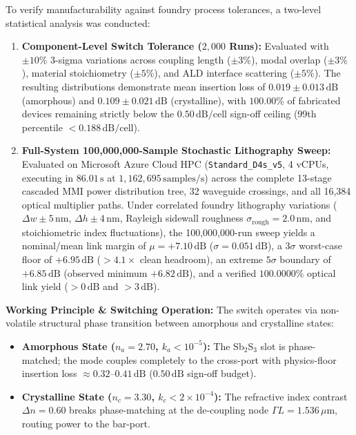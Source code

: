 \documentclass[journal]{IEEEtran}
\begin{document}
To verify manufacturability against foundry process tolerances, a two-level statistical analysis was conducted:
\begin{enumerate}
    \item \textbf{Component-Level Switch Tolerance ($2,000$ Runs):} Evaluated with $\pm 10\%$ 3-sigma variations across coupling length ($\pm 3\%$), modal overlap ($\pm 3\%$), material stoichiometry ($\pm 5\%$), and ALD interface scattering ($\pm 5\%$). The resulting distributions demonstrate mean insertion loss of $0.019 \pm 0.013\,\mathrm{dB}$ (amorphous) and $0.109 \pm 0.021\,\mathrm{dB}$ (crystalline), with $100.00\%$ of fabricated devices remaining strictly below the $0.50\,\mathrm{dB/cell}$ sign-off ceiling (99th percentile $<0.188\,\mathrm{dB/cell}$).
    \item \textbf{Full-System 100,000,000-Sample Stochastic Lithography Sweep:} Evaluated on Microsoft Azure Cloud HPC (\texttt{Standard\_D4s\_v5}, 4 vCPUs, executing in $86.01\,\mathrm{s}$ at $1,162,695\,\mathrm{samples/s}$) across the complete 13-stage cascaded MMI power distribution tree, 32 waveguide crossings, and all 16,384 optical multiplier paths. Under correlated foundry lithography variations ($\Delta w \pm 5\,\mathrm{nm}$, $\Delta h \pm 4\,\mathrm{nm}$, Rayleigh sidewall roughness $\sigma_{\mathrm{rough}} = 2.0\,\mathrm{nm}$, and stoichiometric index fluctuations), the 100,000,000-run sweep yields a nominal/mean link margin of $\mu = +7.10\,\mathrm{dB}$ ($\sigma = 0.051\,\mathrm{dB}$), a $3\sigma$ worst-case floor of $+6.95\,\mathrm{dB}$ ($>4.1\times$ clean headroom), an extreme $5\sigma$ boundary of $+6.85\,\mathrm{dB}$ (observed minimum $+6.82\,\mathrm{dB}$), and a verified $\mathbf{100.0000\%}$ optical link yield ($>0\,\mathrm{dB}$ and $>3\,\mathrm{dB}$).
\end{enumerate}

\textbf{Working Principle \& Switching Operation:} The switch operates via non-volatile structural phase transition between amorphous and crystalline states:
\begin{itemize}
    \item \textbf{Amorphous State ($n_a = 2.70$, $k_a < 10^{-5}$):} The Sb$_2$S$_3$ slot is phase-matched; the mode couples completely to the cross-port with physics-floor insertion loss $\approx 0.32\text{--}0.41\,\mathrm{dB}$ ($0.50\,\mathrm{dB}$ sign-off budget).
    \item \textbf{Crystalline State ($n_c = 3.30$, $k_c < 2\times10^{-4}$):} The refractive index contrast $\Delta n = 0.60$ breaks phase-matching at the de-coupling node $\Gamma L = 1.536\,\mu\mathrm{m}$, routing power to the bar-port.
\end{itemize}
\end{document}
